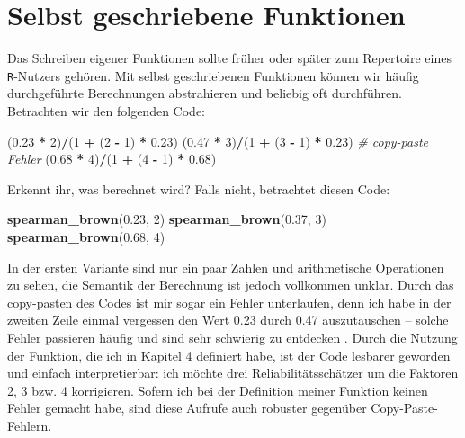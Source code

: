 \documentclass[12pt,]{tufte-book}
\newenvironment{Shaded}{\begin{snugshade}}{\end{snugshade}}
\newcommand{\KeywordTok}[1]{\textcolor[rgb]{0.13,0.29,0.53}{\textbf{#1}}}
\newcommand{\DecValTok}[1]{\textcolor[rgb]{0.00,0.00,0.81}{#1}}
\newcommand{\FloatTok}[1]{\textcolor[rgb]{0.00,0.00,0.81}{#1}}
\newcommand{\StringTok}[1]{\textcolor[rgb]{0.31,0.60,0.02}{#1}}
\newcommand{\CommentTok}[1]{\textcolor[rgb]{0.56,0.35,0.01}{\textit{#1}}}
\newcommand{\OperatorTok}[1]{\textcolor[rgb]{0.81,0.36,0.00}{\textbf{#1}}}
\newcommand{\NormalTok}[1]{#1}
\theoremstyle{definition}
\theoremstyle{definition}
\theoremstyle{definition}
\theoremstyle{remark}
\begin{document}
\section{Selbst geschriebene
Funktionen}\label{selbst-geschriebene-funktionen}

Das Schreiben eigener Funktionen sollte früher oder später zum
Repertoire eines \texttt{R}-Nutzers gehören. Mit selbst geschriebenen
Funktionen können wir häufig durchgeführte Berechnungen abstrahieren und
beliebig oft durchführen. Betrachten wir den folgenden Code:

\begin{Shaded}
\begin{Highlighting}[]
\NormalTok{(}\FloatTok{0.23} \OperatorTok{*}\StringTok{ }\DecValTok{2}\NormalTok{)}\OperatorTok{/}\NormalTok{(}\DecValTok{1} \OperatorTok{+}\StringTok{ }\NormalTok{(}\DecValTok{2} \OperatorTok{-}\StringTok{ }\DecValTok{1}\NormalTok{) }\OperatorTok{*}\StringTok{ }\FloatTok{0.23}\NormalTok{)}
\NormalTok{(}\FloatTok{0.47} \OperatorTok{*}\StringTok{ }\DecValTok{3}\NormalTok{)}\OperatorTok{/}\NormalTok{(}\DecValTok{1} \OperatorTok{+}\StringTok{ }\NormalTok{(}\DecValTok{3} \OperatorTok{-}\StringTok{ }\DecValTok{1}\NormalTok{) }\OperatorTok{*}\StringTok{ }\FloatTok{0.23}\NormalTok{)  }\CommentTok{# copy-paste Fehler}
\NormalTok{(}\FloatTok{0.68} \OperatorTok{*}\StringTok{ }\DecValTok{4}\NormalTok{)}\OperatorTok{/}\NormalTok{(}\DecValTok{1} \OperatorTok{+}\StringTok{ }\NormalTok{(}\DecValTok{4} \OperatorTok{-}\StringTok{ }\DecValTok{1}\NormalTok{) }\OperatorTok{*}\StringTok{ }\FloatTok{0.68}\NormalTok{)}
\end{Highlighting}
\end{Shaded}

Erkennt ihr, was berechnet wird? Falls nicht, betrachtet diesen Code:

\begin{Shaded}
\begin{Highlighting}[]
\KeywordTok{spearman_brown}\NormalTok{(}\FloatTok{0.23}\NormalTok{, }\DecValTok{2}\NormalTok{)}
\KeywordTok{spearman_brown}\NormalTok{(}\FloatTok{0.37}\NormalTok{, }\DecValTok{3}\NormalTok{)}
\KeywordTok{spearman_brown}\NormalTok{(}\FloatTok{0.68}\NormalTok{, }\DecValTok{4}\NormalTok{)}
\end{Highlighting}
\end{Shaded}

In der ersten Variante sind nur ein paar Zahlen und arithmetische
Operationen zu sehen, die Semantik der Berechnung ist jedoch vollkommen
unklar. Durch das copy-pasten des Codes ist mir sogar ein Fehler
unterlaufen, denn ich habe in der zweiten Zeile einmal vergessen den
Wert 0.23 durch 0.47 auszutauschen -- solche Fehler passieren häufig und
sind sehr schwierig zu entdecken \citep[siehe][]{li2006}. Durch die
Nutzung der Funktion, die ich in Kapitel 4 definiert habe, ist der Code
lesbarer geworden und einfach interpretierbar: ich möchte drei
Reliabilitätsschätzer um die Faktoren 2, 3 bzw. 4 korrigieren. Sofern
ich bei der Definition meiner Funktion keinen Fehler gemacht habe, sind
diese Aufrufe auch robuster gegenüber Copy-Paste-Fehlern.
\end{document}

